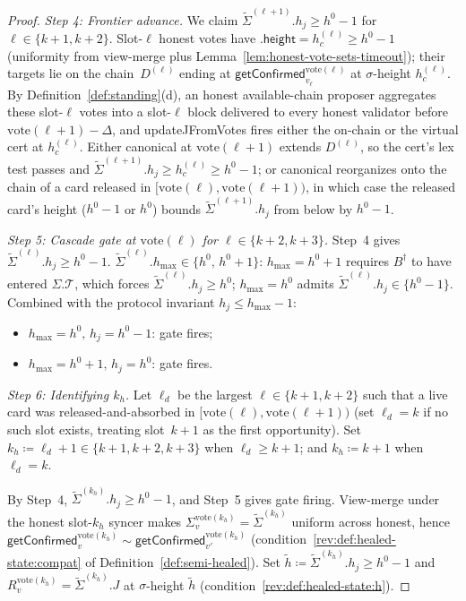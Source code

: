 \documentclass{article}
\newcommand{\T}[0]{\ensuremath{\mathcal{T}}}
\newcommand{\height}{\mathsf{height}}
\newcommand{\hmax}{\ensuremath{h_{\max}}\xspace}
\newcommand{\updateJFromVotes}{\textsf{updateJFromVotes}\xspace}
\newcommand{\vote}{\ensuremath{\mathrm{vote}}}
\newcommand{\comm}[1]{\ensuremath{\widetilde{#1}}}
\newcommand{\getConfirmed}{\textsf{getConfirmed}\xspace}
\theoremstyle{plain}
\theoremstyle{definition}
\theoremstyle{remark}
\begin{document}
\begin{proof}
\emph{Step 4: Frontier advance.}
We claim $\comm{\Sigma}^{(\ell+1)}.h_j \geq h^0 - 1$ for $\ell \in \{k+1, k+2\}$.
Slot-$\ell$ honest votes have $.\height = h_c^{(\ell)} \geq h^0 - 1$ (uniformity from view-merge plus Lemma~\ref{lem:honest-vote-sets-timeout}); their targets lie on the chain~$D^{(\ell)}$ ending at $\getConfirmed_{v_\ell}^{\vote(\ell)}$ at $\sigma$-height $h_c^{(\ell)}$.
By Definition~\ref{def:standing}(d), an honest available-chain proposer aggregates these slot-$\ell$ votes into a slot-$\ell$ block delivered to every honest validator before $\vote(\ell+1) - \Delta$, and \updateJFromVotes{} fires either the on-chain or the virtual cert at $h_c^{(\ell)}$.
Either canonical at $\vote(\ell+1)$ extends $D^{(\ell)}$, so the cert's lex test passes and $\comm{\Sigma}^{(\ell+1)}.h_j \geq h_c^{(\ell)} \geq h^0 - 1$; or canonical reorganizes onto the chain of a card released in $[\vote(\ell), \vote(\ell+1))$, in which case the released card's height ($h^0 - 1$ or $h^0$) bounds $\comm{\Sigma}^{(\ell+1)}.h_j$ from below by $h^0 - 1$.

\emph{Step 5: Cascade gate at $\vote(\ell)$ for $\ell \in \{k+2, k+3\}$.}
Step~4 gives $\comm{\Sigma}^{(\ell)}.h_j \geq h^0 - 1$.
$\comm{\Sigma}^{(\ell)}.\hmax \in \{h^0,\, h^0 + 1\}$: $\hmax = h^0 + 1$ requires $B^\dagger$ to have entered $\Sigma.\T$, which forces $\comm{\Sigma}^{(\ell)}.h_j \geq h^0$; $\hmax = h^0$ admits $\comm{\Sigma}^{(\ell)}.h_j \in \{h^0 - 1\}$.
Combined with the protocol invariant $h_j \leq \hmax - 1$:
\begin{itemize}
  \item $\hmax = h^0,\, h_j = h^0 - 1$: gate fires;
  \item $\hmax = h^0 + 1,\, h_j = h^0$: gate fires.
\end{itemize}

\emph{Step 6: Identifying $k_h$.}
Let $\ell_d$ be the largest $\ell \in \{k+1, k+2\}$ such that a live card was released-and-absorbed in $[\vote(\ell), \vote(\ell+1))$ (set $\ell_d = k$ if no such slot exists, treating slot~$k+1$ as the first opportunity).
Set $k_h \coloneqq \ell_d + 1 \in \{k+1, k+2, k+3\}$ when $\ell_d \geq k+1$; and $k_h \coloneqq k+1$ when $\ell_d = k$.

By Step~4, $\comm{\Sigma}^{(k_h)}.h_j \geq h^0 - 1$, and Step~5 gives gate firing.
View-merge under the honest slot-$k_h$ syncer makes $\Sigma_v^{\vote(k_h)} = \comm{\Sigma}^{(k_h)}$ uniform across honest, hence $\getConfirmed_v^{\vote(k_h)} \sim \getConfirmed_{v'}^{\vote(k_h)}$ (condition~\ref{rev:def:healed-state:compat} of Definition~\ref{def:semi-healed}).
Set $\comm{h} \coloneqq \comm{\Sigma}^{(k_h)}.h_j \geq h^0 - 1$ and $R_v^{\vote(k_h)} = \comm{\Sigma}^{(k_h)}.J$ at $\sigma$-height $\comm{h}$ (condition~\ref{rev:def:healed-state:h}).


\end{proof}
\end{document}

